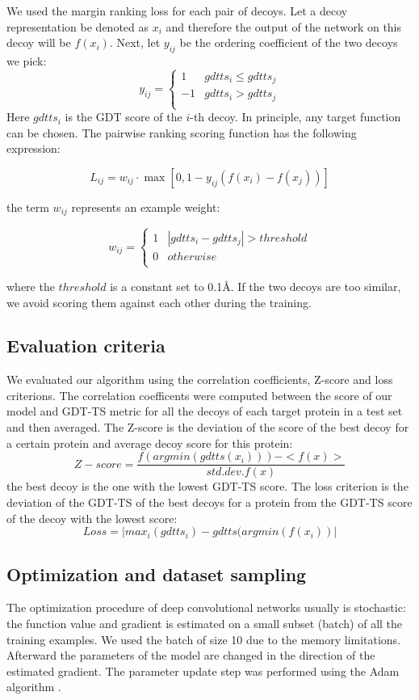 \documentclass[a4paper,10pt]{article}
\begin{document}
We used the margin ranking loss for each pair of decoys. Let a decoy representation be denoted as $x_i$ and therefore the output
of the network on this decoy will be $f(x_i)$. Next, let $y_{ij}$ be the ordering coefficient of the two decoys we pick:
$$
y_{ij} = \begin{cases}
               1& gdtts_i \leq gdtts_j \\
               -1& gdtts_i > gdtts_j \\
            \end{cases}
$$
Here $gdtts_i$ is the GDT score of the $i$-th decoy. In principle, any target function can be chosen. 
The pairwise ranking scoring function has the following expression:

$$ L_{ij} = w_{ij} \cdot \max \left[ 0, 1 - y_{ij} \left( f \left( x_i \right) - f \left( x_j \right) \right) \right] $$

the term $w_{ij}$ represents an example weight:

$$
w_{ij} = \begin{cases}
               1& \left| gdtts_i - gdtts_j \right| > threshold \\
               0& otherwise \\ 
            \end{cases}
$$

where the $threshold$ is a constant set to 0.1{\AA}. If the two decoys are too similar, 
we avoid scoring them against each other during the training.



\subsection{Evaluation criteria}
We evaluated our algorithm using the correlation coefficients, Z-score and loss criterions. The correlation coefficents 
were computed between the score of 
our model and GDT-TS metric for all the decoys of each target protein in a test set and then averaged. 
The Z-score is the deviation of the score of 
the best decoy for a certain protein and average decoy score for this protein:
$$ 
Z-score = \frac{f( argmin(gdtts(x_i)) ) - <f(x)>}{std.dev.f(x)}
$$ 
the best decoy is the one with the lowest GDT-TS score. 
The loss criterion is the deviation of the GDT-TS of the best decoys for a protein from the GDT-TS score of the decoy with the lowest score:
$$ 
Loss = | max_i( gdtts_i ) - gdtts( argmin(f(x_i) ) |
$$ 

\subsection{Optimization and dataset sampling}
The optimization procedure of deep convolutional networks usually is stochastic: the function value and gradient 
is estimated on a small subset (batch) of all the training 
examples. We used the batch of size 10 due to the memory limitations. Afterward the parameters of the model are 
changed in the direction of the estimated gradient.
The parameter update step was performed using the Adam algorithm \cite{}. 
\end{document}

